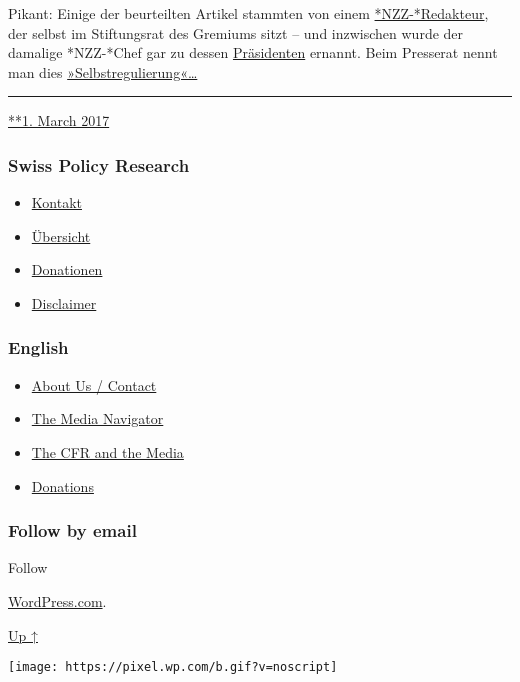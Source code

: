Pikant: Einige der be­ur­teil­ten Ar­tikel stam­mten von einem
\href{http://www.nzz.ch/international/europa/beschwerde-beim-presserat-kritik-an-nzz-abgewiesen-ld.104814}{*NZZ-*Redak­teur},
der selbst im Stif‌­tungs­rat des Gremiums sitzt -- und inzwischen wurde
der damalige *NZZ-*Chef gar zu dessen
\href{http://www.nzz.ch/schweiz/medien-selbstregulierung-markus-spillmann-wird-praesident-des-presserats-ld.135619}{Prä­si­denten}
ernannt. Beim Presse­rat nennt man dies
\href{https://de.wikipedia.org/wiki/Schweizer_Presserat}{»Selbst­re­gu­lierung«\ldots{}}

\begin{center}\rule{0.5\linewidth}{\linethickness}\end{center}

\href{https://swprs.org/2017/03/01/der-schweizer-presserat/}{**1. March
2017}

\hypertarget{swiss-policy-research}{%
\subsubsection{Swiss Policy Research}\label{swiss-policy-research}}

\begin{itemize}
\tightlist
\item
  \href{https://swprs.org/kontakt/}{Kontakt}
\item
  \href{https://swprs.org/uebersicht/}{Übersicht}
\item
  \href{https://swprs.org/donationen/}{Donationen}
\item
  \href{https://swprs.org/disclaimer/}{Disclaimer}
\end{itemize}

\hypertarget{english}{%
\subsubsection{English}\label{english}}

\begin{itemize}
\tightlist
\item
  \href{https://swprs.org/contact/}{About Us / Contact}
\item
  \href{https://swprs.org/media-navigator/}{The Media Navigator}
\item
  \href{https://swprs.org/the-american-empire-and-its-media/}{The CFR
  and the Media}
\item
  \href{https://swprs.org/donations/}{Donations}
\end{itemize}

\hypertarget{follow-by-email}{%
\subsubsection{Follow by email}\label{follow-by-email}}

Follow

\href{https://wordpress.com/?ref=footer_custom_com}{WordPress.com}.

\protect\hyperlink{}{Up ↑}

\texttt{[image: https://pixel.wp.com/b.gif?v=noscript]}

